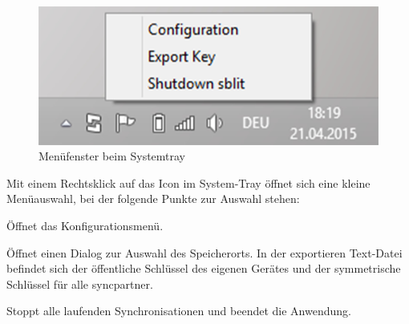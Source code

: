 \begin{figure}[H]
	\centering
	\includegraphics[]{images/systemtray.jpg}
  \caption{Menüfenster beim Systemtray}
\end{figure}

Mit einem Rechtsklick auf das Icon im System-Tray öffnet sich eine kleine Menüauswahl,
bei der folgende Punkte zur Auswahl stehen:

\begin{description}

		Öffnet das Konfigurationsmenü.

		Öffnet einen Dialog zur Auswahl des Speicherorts. In der exportieren Text-Datei befindet
		sich der öffentliche Schlüssel des eigenen Gerätes und der symmetrische Schlüssel für
		alle \gls{syncpartner}.

	  Stoppt alle laufenden Synchronisationen und beendet die Anwendung.
\end{description}
